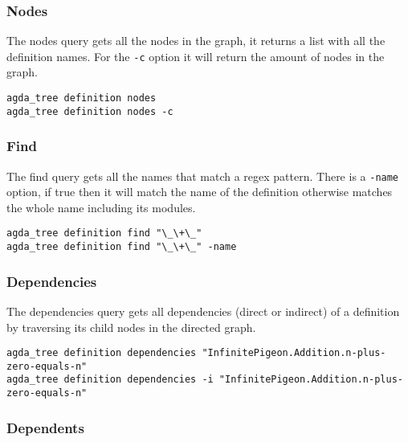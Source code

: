 \subsubsection{Nodes}

The nodes query gets all the nodes in the graph, it returns a list with all the
definition names. For the \texttt{-c} option it will return the amount of nodes
in the graph. 

\noindent
\begin{minipage}{\textwidth}
\begin{lstlisting}
agda_tree definition nodes
agda_tree definition nodes -c
\end{lstlisting}
\end{minipage}

\subsubsection{Find}

The find query gets all the names that match a regex pattern. There is a
\texttt{-name} option, if true then it will match the name of the definition
otherwise matches the whole name including its modules.

\noindent
\begin{minipage}{\textwidth}
\begin{lstlisting}
agda_tree definition find "\_\+\_"
agda_tree definition find "\_\+\_" -name
\end{lstlisting}
\end{minipage}

\subsubsection{Dependencies}

The dependencies query gets all dependencies (direct or indirect) of a
definition by traversing its child nodes in the directed graph.


\noindent
\begin{minipage}{\textwidth}
\begin{lstlisting}
agda_tree definition dependencies "InfinitePigeon.Addition.n-plus-zero-equals-n"
agda_tree definition dependencies -i "InfinitePigeon.Addition.n-plus-zero-equals-n"
\end{lstlisting}
\end{minipage}

\subsubsection{Dependents}


